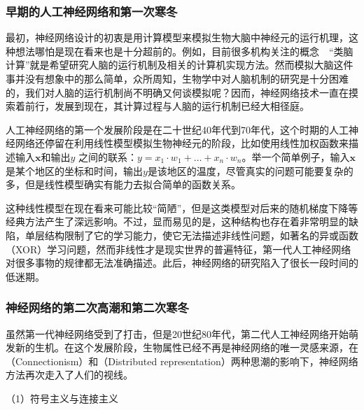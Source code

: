 \subsubsection{早期的人工神经网络和第一次寒冬}

\parinterval 最初，神经网络设计的初衷是用计算模型来模拟生物大脑中神经元的运行机理，这种想法哪怕是现在看来也是十分超前的。例如，目前很多机构关注的概念\ \dash \ ``类脑计算''就是希望研究人脑的运行机制及相关的计算机实现方法。然而模拟大脑这件事并没有想象中的那么简单，众所周知，生物学中对人脑机制的研究是十分困难的，我们对人脑的运行机制尚不明确又何谈模拟呢？因而，神经网络技术一直在摸索着前行，发展到现在，其计算过程与人脑的运行机制已经大相径庭。

\parinterval 人工神经网络的第一个发展阶段是在二十世纪40年代到70年代，这个时期的人工神经网络还停留在利用线性模型模拟生物神经元的阶段，比如使用线性加权函数来描述输入$ \mathbf x $和输出$ y $ 之间的联系：$y=x_1 \cdot w_1 + \dots + x_n \cdot w_n $。举一个简单例子，输入$ \mathbf x $是某个地区的坐标和时间，输出$ y $是该地区的温度，尽管真实的问题可能要复杂的多，但是线性模型确实有能力去拟合简单的函数关系。

\parinterval 这种线性模型在现在看来可能比较``简陋''，但是这类模型对后来的随机梯度下降等经典方法产生了深远影响。不过，显而易见的是，这种结构也存在着非常明显的缺陷，单层结构限制了它的学习能力，使它无法描述非线性问题，如著名的异或函数（XOR）学习问题，然而非线性才是现实世界的普遍特征，第一代人工神经网络对很多事物的规律都无法准确描述。此后，神经网络的研究陷入了很长一段时间的低迷期。


\subsubsection{神经网络的第二次高潮和第二次寒冬}

\parinterval 虽然第一代神经网络受到了打击，但是20世纪80年代，第二代人工神经网络开始萌发新的生机。在这个发展阶段，生物属性已经不再是神经网络的唯一灵感来源，在{\small{}}（Connectionism）和{\small{}}（Distributed representation）两种思潮的影响下，神经网络方法再次走入了人们的视线。

\vspace{0.3em}
\parinterval （1）符号主义与连接主义
\vspace{0.3em}

